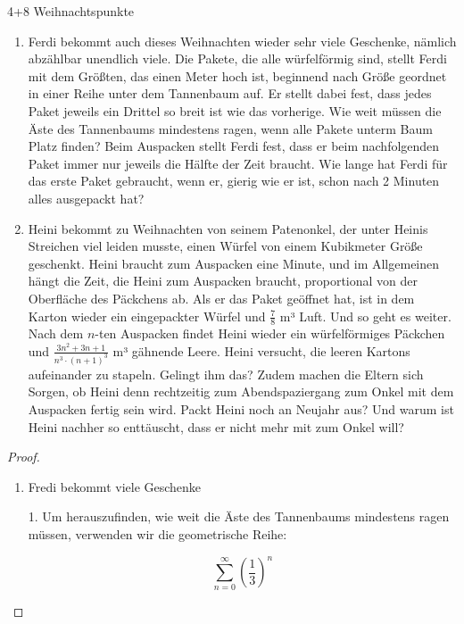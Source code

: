 \documentclass{../problemset}
\begin{document}
\begin{problem}[Weihnachtsaufgaben*]{4+8 Weihnachtspunkte}
\begin{enumerate}
	\item Ferdi bekommt auch dieses Weihnachten wieder sehr viele Geschenke, nämlich
	      abzählbar unendlich viele. Die Pakete, die alle würfelförmig sind, stellt Ferdi
	      mit dem Größten, das einen Meter hoch ist, beginnend nach Größe geordnet in
	      einer Reihe unter dem Tannenbaum auf. Er stellt dabei fest, dass jedes Paket
	      jeweils ein Drittel so breit ist wie das vorherige. Wie weit müssen die Äste
	      des Tannenbaums mindestens ragen, wenn alle Pakete unterm Baum Platz finden?
	      Beim Auspacken stellt Ferdi fest, dass er beim nachfolgenden Paket immer nur
	      jeweils die Hälfte der Zeit braucht. Wie lange hat Ferdi für das erste Paket
	      gebraucht, wenn er, gierig wie er ist, schon nach 2 Minuten alles ausgepackt
	      hat?
	\item Heini bekommt zu Weihnachten von seinem Patenonkel, der unter Heinis Streichen
	      viel leiden musste, einen Würfel von einem Kubikmeter Größe geschenkt. Heini
	      braucht zum Auspacken eine Minute, und im Allgemeinen hängt die Zeit, die Heini
	      zum Auspacken braucht, proportional von der Oberfläche des Päckchens ab. Als er
	      das Paket geöffnet hat, ist in dem Karton wieder ein eingepackter Würfel und
	      $\frac{7}{8}$ m³ Luft. Und so geht es weiter. Nach dem $n$-ten Auspacken findet
	      Heini wieder ein würfelförmiges Päckchen und
	      $\frac{3n^2+3n+1}{n^3\cdot(n+1)^3}$ m³ gähnende Leere. Heini versucht, die
	      leeren Kartons aufeinander zu stapeln. Gelingt ihm das? Zudem machen die Eltern
	      sich Sorgen, ob Heini denn rechtzeitig zum Abendspaziergang zum Onkel mit dem
	      Auspacken fertig sein wird. Packt Heini noch an Neujahr aus? Und warum ist
	      Heini nachher so enttäuscht, dass er nicht mehr mit zum Onkel will?
\end{enumerate}

\begin{proof}
	$ $

	\begin{enumerate}
		\item Fredi bekommt viele Geschenke

		      1. Um herauszufinden, wie weit die Äste des Tannenbaums mindestens ragen müssen, verwenden wir die geometrische Reihe:

		      \[
			      \sum_{n=0}^{\infty} {\left(\frac{1}{3}\right)}^n
		      \]


\end{enumerate}
\end{proof}
\end{problem}
\end{document}
